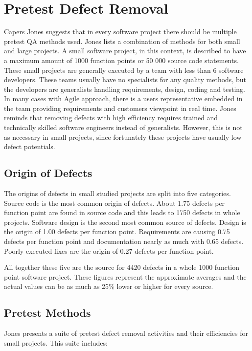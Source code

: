  \section{Pretest Defect Removal}

Capers Jones suggests that in every software project there should be multiple pretest QA methods used. Jones lists a combination of methods for both small and large projects. A small software project, in this context, is described to have a maximum amount of 1000 function points or 50 000 source code statements. These small projects are generally executed by a team with less than 6 software developers. These teams usually have no specialists for any quality methods, but the developers are generalists handling requirements, design, coding and testing. In many cases with Agile approach, there is a users representative embedded in the team providing requirements and customers viewpoint in real time. Jones reminds that removing defects with high efficiency requires trained and technically skilled software engineers instead of generalists. However, this is not as necessary in small projects, since fortunately these projects have usually low defect potentials.

\subsection{Origin of Defects}

The origins of defects in small studied projects are split into five categories. Source code is the most common origin of defects. About 1.75 defects per function point are found in source code and this leads to 1750 defects in whole projects. Software design is the second most common source of defects. Design is the origin of 1.00 defects per function point. Requirements are causing 0.75 defects per function point and documentation nearly as much with 0.65 defects. Poorly executed fixes are the origin of 0.27 defects per function point. 

All together these five are the source for 4420 defects in a whole 1000 function point software project. These figures represent the approximate averages and the actual values can be as much as 25\% lower or higher for every source. 

\subsection{Pretest Methods}

Jones presents a suite of pretest defect removal activities and their efficiencies for small projects. This suite includes:

